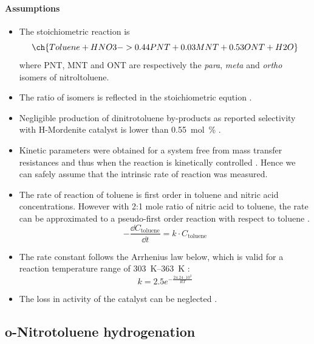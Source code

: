 \paragraph{Assumptions}
\begin{itemize}
    \item The stoichiometric reaction is
    \begin{equation}
        \ch{Toluene +  HNO3 -> 0.44 PNT + 0.03 MNT + 0.53 ONT + H2O}
    \end{equation}
    where PNT, MNT and ONT are respectively the \textit{para}, \textit{meta} and \textit{ortho} isomers of nitroltoluene.
    \item The ratio of isomers is reflected in the stoichiometric eqution \cite{smith_novel_1998}.
    \item Negligible production of dinitrotoluene by-products as reported selectivity with H-Mordenite catalyst is lower than \SI{0.55}{mol\percent} \cite{jeeru_kinetics_2018}.
    \item Kinetic parameters were obtained for a system free from mass transfer resistances and thus when the reaction is kinetically controlled \cite{jeeru_kinetics_2018}. Hence we can safely assume that the intrinsic rate of reaction was measured.
    \item The rate of reaction of toluene is first order in toluene and nitric acid concentrations. However with 2:1 mole ratio of nitric acid to toluene, the rate can be approximated to a pseudo-first order reaction with respect to toluene \cite{jeeru_kinetics_2018}.
    \begin{equation}
    - \frac{\dd C_\text{toluene}}{\dd t}=k \cdot C_\text{toluene} 
    \end{equation}
    \item The rate constant follows the Arrhenius law below, which is valid for a reaction temperature range of \SIrange{303}{363}{\K} \cite{jeeru_kinetics_2018}:
    \begin{equation}
        k=2.5e^{-\frac{24.24\cdot 10^{3}}{RT}}
    \end{equation}
    \item The loss in activity of the catalyst can be neglected \cite{jeeru_kinetics_2018}.
\end{itemize}

\subsection{o-Nitrotoluene hydrogenation}
